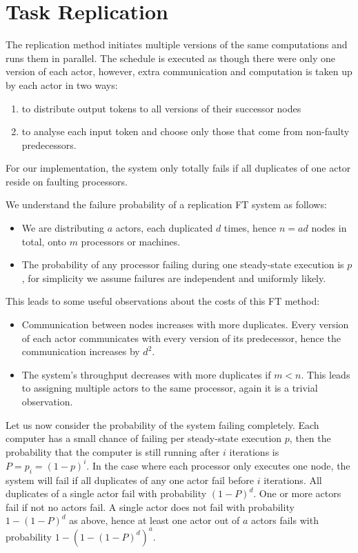 \section{Task Replication}
\label{secModRep}

The replication method initiates multiple versions of the same computations and runs them in parallel.
The schedule is executed as though there were only one version of each actor, however, extra communication and computation is taken up by each actor in two ways:
\begin{enumerate}
	\item to distribute output tokens to all versions of their successor nodes
	\item to analyse each input token and choose only those that come from non-faulty predecessors.
\end{enumerate}
\noindent For our implementation, the system only totally fails if all duplicates of one actor reside on faulting processors.

We understand the failure probability of a replication FT system as follows:
\begin{itemize}
	\item We are distributing $a$ actors, each duplicated $d$ times, hence $n = ad$ nodes in total, onto $m$ processors or machines.
	\item The probability of any processor failing during one steady-state execution is $p$, for simplicity we assume failures are independent and uniformly likely.
\end{itemize}

\noindent This leads to some useful observations about the costs of this FT method:

\begin{itemize}
	\item Communication between nodes increases with more duplicates.
			Every version of each actor communicates with every version of its predecessor, hence the communication increases by $d^2$.
	\item The system's throughput decreases with more duplicates if $m < n$.
			This leads to assigning multiple actors to the same processor, again it is a trivial observation.
\end{itemize}

Let us now consider the probability of the system failing completely.
Each computer has a small chance of failing per steady-state execution $p$, then the probability that the computer is still running after $i$ iterations is $P = p_i = (1-p)^i$.
In the case where each processor only executes one node, the system will fail if all duplicates of any one actor fail before $i$ iterations.
All duplicates of a single actor fail with probability $(1-P)^d$.
One or more actors fail if not no actors fail.
A single actor does not fail with probability $1-(1-P)^d$ as above, hence at least one actor out of $a$ actors fails with probability $1-(1-(1-P)^d)^a$.

